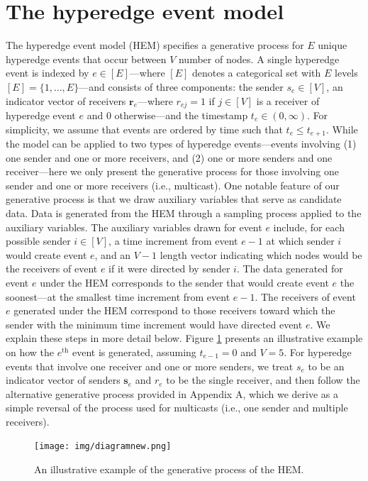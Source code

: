 \documentclass[ba]{imsart}
\numberwithin{equation}{section}
\theoremstyle{plain}
\begin{document}
	\section{The hyperedge event model}\label{sec:generative process}
	

	The hyperedge event model (HEM) specifies a generative process for $E$ unique hyperedge events that occur between $V$ number of nodes. A single hyperedge event is indexed by $e \in [E]$---where $[E]$ denotes a categorical set with $E$ levels $[E] = \{1,\ldots,E\}$---and consists of three components: the sender $s_e \in [V]$, an indicator vector of receivers $\boldsymbol{r}_e$---where $r_{ej}=1$ if $j \in [V]$ is a receiver of hyperedge event $e$ and 0 otherwise---and the timestamp $t_e \in (0, \infty)$. For simplicity, we assume that events are ordered by time such that $t_e \leq t_{e+1}$. While the model can be applied to two types of hyperedge events---events involving (1) one sender and one or more receivers, and (2) one or more senders and one receiver---here we only present the generative process for those involving one sender and one or more receivers (i.e., multicast). One notable feature of our generative process is that we draw auxiliary variables that serve as candidate data. Data is generated from the HEM through a sampling process applied to the auxiliary variables. The auxiliary variables drawn for event $e$ include, for each possible sender $i \in [V]$, a time increment from event $e-1$ at which sender $i$ would create event $e$, and an $V-1$ length vector indicating which nodes would be the receivers of event $e$ if it were directed by sender $i$.  The data generated for event $e$ under the HEM corresponds to the sender that would create event $e$ the soonest---at the smallest time increment from event $e-1$. The receivers of event $e$ generated under the HEM correspond to those receivers toward which the sender with the minimum time increment would have directed event $e$. We explain these steps in more detail below. Figure \ref{figure:diagram} presents an illustrative example on how the $e^{\textrm{th}}$ event is generated, assuming $t_{e-1} = 0$ and $V=5$. For hyperedge events that involve one receiver and one or more senders, we treat $s_e$ to be an indicator vector of senders $\boldsymbol{s}_e$ and $r_e$ to be the single receiver, and then follow the alternative generative process provided in Appendix A, which we derive as a simple reversal of the process used for multicasts (i.e., one sender and multiple receivers).~
			\begin{figure}[!t]
				\centering
				\texttt{[image: img/diagramnew.png]}	
				\caption {An illustrative example of the generative process of the HEM.}
				\label{figure:diagram}
			\end{figure}	
\end{document}
